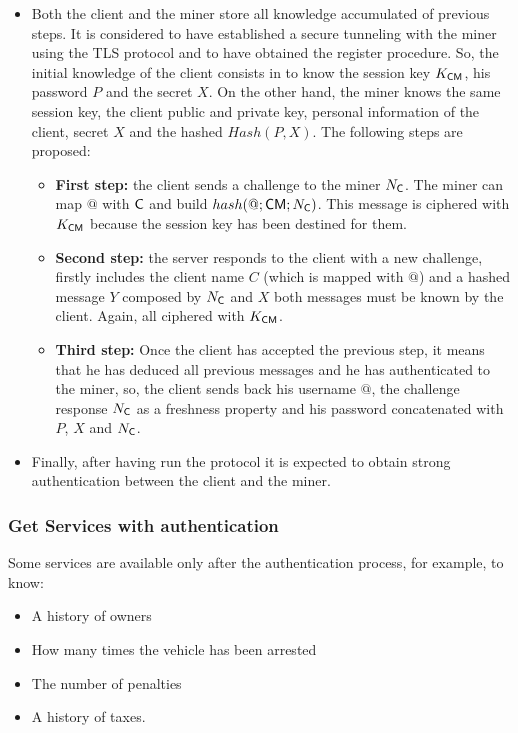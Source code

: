 \begin{itemize}
  \item Both the client and the miner store all knowledge accumulated
    of previous steps. It is considered to have established a secure tunneling 
    with the miner using the TLS protocol and to have obtained the register
    procedure. So, the initial knowledge of the client consists in to know 
    the session key $K_{\textsf{C}\textsf{M}}$, his password $P$ and the secret $X$. 
    On the other hand, the miner knows the same session key, the client public and
    private key, personal information of the client, secret $X$ and the hashed 
    $Hash(P,X)$. The following steps are proposed:
    \begin{itemize}
    \item \textbf{First step:} the client sends a challenge to the
      miner $N_{\textsf{C}}$. The miner can map $@$ with $\textsf{C}$ and build $hash(@;\textsf{C}\textsf{M}; N_{\textsf{C}})$. This message is ciphered with $K_{\textsf{C}\textsf{M}}$ because the session key has been destined for them. 
    \item \textbf{Second step:} the server responds to the client with a new challenge,
      firstly includes the client name $C$ (which is mapped with $@$) and a hashed message
      $Y$ composed by $N_{\textsf{C}}$ and $X$ both messages must be known by the client. Again,
      all ciphered with $K_{\textsf{C}\textsf{M}}$.
    \item \textbf{Third step:} Once the client has accepted the previous step, it means that
      he has deduced all previous messages and he has authenticated to the miner, so, the 
      client sends back his username $@$, the challenge response $N_{\textsf{C}}$ as a freshness
      property and his password concatenated with $P$, $X$ and $N_{\textsf{C}}$.
  \end{itemize}
\item Finally, after having run the protocol it is expected to obtain strong authentication
    between the client and the miner. 
\end{itemize}
 


\subsubsection{Get Services with authentication}
\label{ssec:getServAuth}
Some services are available only after the authentication process, for example, to know:
\begin{itemize}
    \item A history of owners
    \item How many times the vehicle has been arrested 
    \item The number of penalties
    \item A history of taxes.
\end{itemize}

